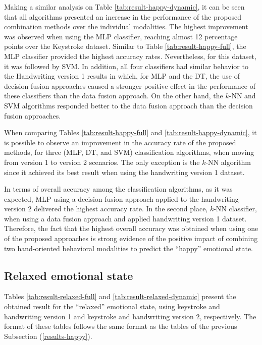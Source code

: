 \documentclass[conference]{IEEEtran}
\begin{document}
Making a similar analysis on Table \ref{tab:result-happy-dynamic}, it can be seen that all algorithms presented an increase in the performance of the proposed combination methods over the individual modalities. The highest improvement was observed when using the MLP classifier, reaching almost 12 percentage points over the Keystroke dataset.
Similar to Table \ref{tab:result-happy-full}, the MLP classifier provided the highest accuracy rates. Nevertheless, for this dataset, it was followed by  SVM. In addition, all four classifiers had similar behavior to the Handwriting version 1 results in which, for MLP and the DT, the use of decision fusion approaches caused a stronger positive effect in the performance of these classifiers than the data fusion approach. On the other hand, the $k$-NN and SVM algorithms responded better to the data fusion approach than the decision fusion approaches.

When comparing Tables \ref{tab:result-happy-full} and  \ref{tab:result-happy-dynamic}, it is possible to observe an improvement in the accuracy rate of the proposed methods, for three (MLP, DT, and SVM) classification algorithms, when moving from version 1 to version 2 scenarios. The only exception is the $k$-NN algorithm since it achieved its best result when using the handwriting version 1 dataset.

In terms of overall accuracy among the classification algorithms, as it was expected,  MLP using a decision fusion approach applied to the handwriting version 2 delivered the highest accuracy rate. In the second place, $k$-NN classifier, when using a data fusion approach and applied handwriting version 1 dataset. 
Therefore, the fact that the highest overall accuracy was obtained when using one of the proposed approaches is strong evidence of the positive impact of combining two hand-oriented behavioral modalities to predict the ``happy'' emotional state.

\subsection{Relaxed emotional state}
\label{results-relaxed}

Tables \ref{tab:result-relaxed-full} and \ref{tab:result-relaxed-dynamic} present the obtained result for the ``relaxed'' emotional state,  using   keystroke and handwriting version 1 and keystroke and handwriting version 2, respectively. The format of these tables follows the same format as the tables of the previous Subsection (\ref{results-happy}).
\end{document}
